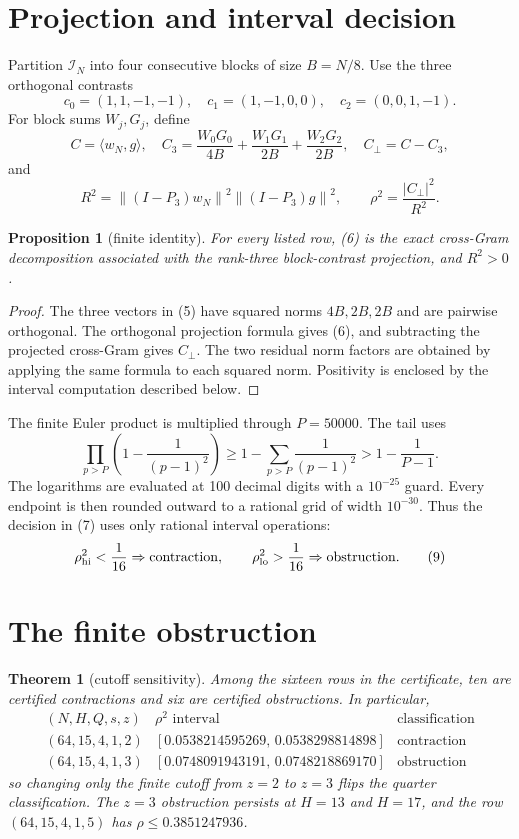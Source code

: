 \documentclass[11pt]{article}
\newtheorem{theorem}{Theorem}
\newtheorem{proposition}{Proposition}
\newcommand{\norm}[1]{\left\lVert #1\right\rVert}
\newcommand{\cI}{\mathcal I}
\begin{document}
\section{Projection and interval decision}
Partition \(\cI_N\) into four consecutive blocks of size \(B=N/8\).
Use the three orthogonal contrasts
\[
 c_0=(1,1,-1,-1),\quad c_1=(1,-1,0,0),\quad
 c_2=(0,0,1,-1).                                          \tag{5}
\]
For block sums \(W_j,G_j\), define
\[
 C=\langle w_N,g\rangle,\quad
 C_3=\frac{W_0G_0}{4B}+\frac{W_1G_1}{2B}+\frac{W_2G_2}{2B},
 \quad C_\perp=C-C_3,                                     \tag{6}
\]
and
\[
 R^2=\norm{(I-P_3)w_N}^2\norm{(I-P_3)g}^2,\qquad
 \rho^2=\frac{\lvert C_\perp\rvert^2}{R^2}.                \tag{7}
\]

\begin{proposition}[finite identity]
For every listed row, (6) is the exact cross-Gram decomposition associated
with the rank-three block-contrast projection, and \(R^2>0\).
\end{proposition}

\begin{proof}
The three vectors in (5) have squared norms \(4B,2B,2B\) and are pairwise
orthogonal. The orthogonal projection formula gives (6), and subtracting
the projected cross-Gram gives \(C_\perp\). The two residual norm factors
are obtained by applying the same formula to each squared norm. Positivity
is enclosed by the interval computation described below.
\end{proof}

The finite Euler product is multiplied through \(P=50000\). The tail uses
\[
 \prod_{p>P}\left(1-\frac1{(p-1)^2}\right)
 \geq 1-\sum_{p>P}\frac1{(p-1)^2}
 >1-\frac1{P-1}.                                         \tag{8}
\]
The logarithms are evaluated at 100 decimal digits with a \(10^{-25}\)
guard. Every endpoint is then rounded outward to a rational grid of width
\(10^{-30}\). Thus the decision in (7) uses only rational interval
operations:
\[
 \rho^2_{\rm hi}<\frac1{16}\Rightarrow\text{contraction},\qquad
 \rho^2_{\rm lo}>\frac1{16}\Rightarrow\text{obstruction}. \tag{9}
\]
\section{The finite obstruction}

\begin{theorem}[cutoff sensitivity]
Among the sixteen rows in the certificate, ten are certified contractions
and six are certified obstructions. In particular,
\[
\begin{array}{c|c|c}
(N,H,Q,s,z)&\rho^2\text{ interval}&\text{classification}\\ \hline
(64,15,4,1,2)&[0.0538214595269,\,0.0538298814898]&\text{contraction}\\
(64,15,4,1,3)&[0.0748091943191,\,0.0748218869170]&\text{obstruction}
\end{array}
\]
so changing only the finite cutoff from \(z=2\) to \(z=3\) flips the
quarter classification. The \(z=3\) obstruction persists at \(H=13\)
and \(H=17\), and the row \((64,15,4,1,5)\) has
\(\rho\leq0.3851247936\).
\end{theorem}
\end{document}
